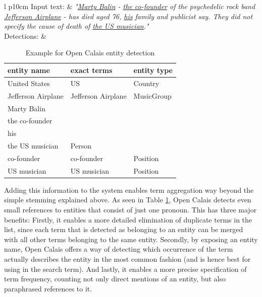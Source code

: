 \documentclass[11pt,a4paper,twoside]{article}
\begin{document}
\begin{table}[ht]
    \caption{Example for Open Calais entity detection}
    \centering
    \begin{tabular}{l p{10cm}}
        Input text: & \nohyphens{\emph{"\underline{Marty Balin} - \underline{the co-founder} of the psychedelic rock band \underline{Jefferson Airplane} - has died aged 76, \underline{his} family and publicist say. They did not specify the cause of death of \underline{the US musician}."}} \bigskip \\
        
        Detections: & \begin{tabular}{|l|l|l|}
         \hline
         \textbf{entity name} & \textbf{exact terms}        & \textbf{entity type}       \\
         \hline
         United States      & US                            & Country           \\
         \hline
         Jefferson Airplane & Jefferson Airplane            & MusicGroup        \\
         \hline
         Marty Balin        & \pbox{50cm}{\vspace{.2\baselineskip}Marty Balin\\the co-founder\\his\\the US musician\vspace{.3\baselineskip}} & Person            \\
         \hline
         co-founder & co-founder & Position \\
         \hline
         US musician & US musician & Position \\
         \hline
    \end{tabular}
    \end{tabular}
    \label{table:calais-example}
\end{table}

Adding this information to the system enables term aggregation way beyond the simple stemming explained above. As seen in Table \ref{table:calais-example}, Open Calais detects even small references to entities that consist of just one pronoun. This has three major benefits: Firstly, it enables a more detailed elimination of duplicate terms in the list, since each term that is detected as belonging to an entity can be merged with all other terms belonging to the same entity. Secondly, by exposing an entity name, Open Calais offers a way of detecting which occurrence of the term actually describes the entity in the most common fashion (and is hence best for using in the search term). And lastly, it enables a more precise specification of term frequency, counting not only direct mentions of an entity, but also paraphrased references to it.
\end{document}
